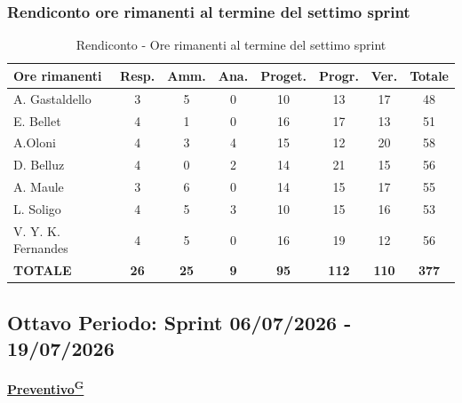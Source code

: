 \documentclass[a4paper,12pt]{article}
\providecommand{\glslink}[2]{\href{https://alittlebyte-19.github.io/Documentazione/glossario.html\#gls-#1}{\underline{#2}\textsuperscript{\scriptsize G}}}
\begin{document}
\subsubsection{Rendiconto ore rimanenti al termine del settimo sprint}
\begin{table}[htbp]
\centering
\renewcommand{\arraystretch}{1.5}
\begin{tabularx}{\textwidth}{|X|c|c|c|c|c|c|c|}
\hline
\textbf{Ore rimanenti} & \textbf{Resp.} & \textbf{Amm.} & \textbf{Ana.} & \textbf{Proget.} & \textbf{Progr.} & \textbf{Ver.} & \textbf{Totale} \\
\hline
A. Gastaldello & 3 & 5 & 0 & 10 & 13 & 17 & 48 \\
\hline
E. Bellet & 4 & 1 & 0 & 16 & 17 & 13 & 51 \\
\hline
A.Oloni & 4 & 3 & 4 & 15 & 12 & 20 & 58 \\
\hline
D. Belluz & 4 & 0 & 2 & 14 & 21 & 15 & 56 \\
\hline
A. Maule & 3 & 6 & 0 & 14 & 15 & 17 & 55 \\
\hline
L. Soligo & 4 & 5 & 3 & 10 & 15 & 16 & 53 \\
\hline
V. Y. K. Fernandes & 4 & 5 & 0 & 16 & 19 & 12 & 56 \\
\hline
\rowcolor{gray!20}
\textbf{TOTALE} & \textbf{26} & \textbf{25} & \textbf{9} & \textbf{95} & \textbf{112} & \textbf{110} & \textbf{377} \\
\hline
\end{tabularx}
\caption{Rendiconto - Ore rimanenti al termine del settimo sprint}
\end{table}

\newpage
\subsection {Ottavo Periodo: Sprint 06/07/2026 - 19/07/2026}

\label{sec:pec_ottavoperiodo}

\vspace{0.5em}

\begin{center}
\noindent\textbf{\glslink{preventivo}{Preventivo}}
\end{center}
\end{document}
